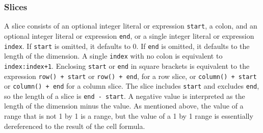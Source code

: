 \subsubsection{Slices}
A slice consists of an optional integer literal or expression \texttt{start}, a colon, and an optional integer literal or expression \texttt{end}, or a single integer literal or expression \texttt{index}. If \texttt{start} is omitted, it defaults to 0. If \texttt{end} is omitted, it defaults to the length of the dimension. A single \texttt{index} with no colon is equivalent to \texttt{index:index+1}. Enclosing \texttt{start} or \texttt{end} in square brackets is equivalent to the expression \texttt{row() + start} or \texttt{row() + end}, for a row slice, or \texttt{column() + start} or \texttt{column() + end} for a column slice. The slice includes \texttt{start} and excludes \texttt{end}, so the length of a slice is \texttt{end - start}. A negative value is interpreted as the length of the dimension minus the value.
			As mentioned above, the value of a range that is not 1 by 1 is a range, but the value of a 1 by 1 range is essentially dereferenced to the result of the cell formula.
